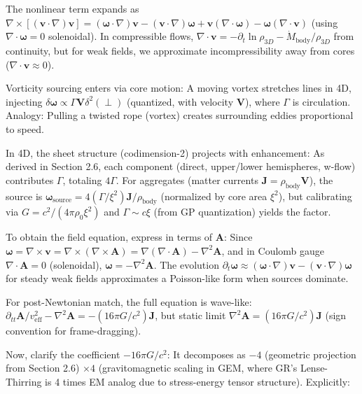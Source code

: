 \documentclass{article}
\begin{document}
The nonlinear term expands as $\nabla \times [(\mathbf{v} \cdot \nabla) \mathbf{v}] = (\boldsymbol{\omega} \cdot \nabla) \mathbf{v} - (\mathbf{v} \cdot \nabla) \boldsymbol{\omega} + \mathbf{v} (\nabla \cdot \boldsymbol{\omega}) - \boldsymbol{\omega} (\nabla \cdot \mathbf{v})$ (using $\nabla \cdot \boldsymbol{\omega} = 0$ solenoidal). In compressible flows, $\nabla \cdot \mathbf{v} = - \partial_t \ln \rho_{3D} - \dot{M}_{\text{body}} / \rho_{3D}$ from continuity, but for weak fields, we approximate incompressibility away from cores ($\nabla \cdot \mathbf{v} \approx 0$).

Vorticity sourcing enters via core motion: A moving vortex stretches lines in 4D, injecting $\delta \boldsymbol{\omega} \propto \Gamma \mathbf{V} \delta^2(\perp)$ (quantized, with velocity $\mathbf{V}$), where $\Gamma$ is circulation. Analogy: Pulling a twisted rope (vortex) creates surrounding eddies proportional to speed.

In 4D, the sheet structure (codimension-2) projects with enhancement: As derived in Section 2.6, each component (direct, upper/lower hemispheres, w-flow) contributes $\Gamma$, totaling $4\Gamma$. For aggregates (matter currents $\mathbf{J} = \rho_{\text{body}} \mathbf{V}$), the source is $\boldsymbol{\omega}_{\text{source}} = 4 (\Gamma / \xi^2) \mathbf{J} / \rho_{\text{body}}$ (normalized by core area $\xi^2$), but calibrating via $G = c^2 / (4\pi \rho_0 \xi^2)$ and $\Gamma \sim c \xi$ (from GP quantization) yields the factor.

To obtain the field equation, express in terms of $\mathbf{A}$: Since $\boldsymbol{\omega} = \nabla \times \mathbf{v} = \nabla \times (\nabla \times \mathbf{A}) = \nabla (\nabla \cdot \mathbf{A}) - \nabla^2 \mathbf{A}$, and in Coulomb gauge $\nabla \cdot \mathbf{A} = 0$ (solenoidal), $\boldsymbol{\omega} = - \nabla^2 \mathbf{A}$. The evolution $\partial_t \boldsymbol{\omega} \approx (\boldsymbol{\omega} \cdot \nabla) \mathbf{v} - (\mathbf{v} \cdot \nabla) \boldsymbol{\omega}$ for steady weak fields approximates a Poisson-like form when sources dominate.

For post-Newtonian match, the full equation is wave-like: $\partial_{tt} \mathbf{A} / v_{\text{eff}}^2 - \nabla^2 \mathbf{A} = - (16\pi G / c^2) \mathbf{J}$, but static limit $\nabla^2 \mathbf{A} = (16\pi G / c^2) \mathbf{J}$ (sign convention for frame-dragging).

Now, clarify the coefficient $-16\pi G / c^2$: It decomposes as $-4$ (geometric projection from Section 2.6) $\times 4$ (gravitomagnetic scaling in GEM, where GR's Lense-Thirring is 4 times EM analog due to stress-energy tensor structure). Explicitly:
\end{document}
